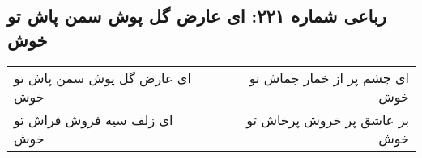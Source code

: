 \begin{center}
\section*{رباعی شماره ۲۲۱: ای عارض گل پوش سمن پاش تو خوش}
\label{sec:sh221}
\begin{longtable}{l p{0.5cm} r}
ای عارض گل پوش سمن پاش تو خوش
&&
ای چشم پر از خمار جماش تو خوش
\\
ای زلف سیه فروش فراش تو خوش
&&
بر عاشق پر خروش پرخاش تو خوش
\\
\end{longtable}
\end{center}
